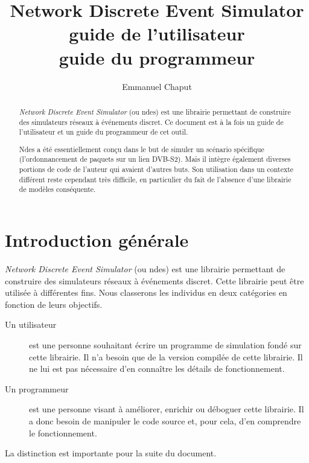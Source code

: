 \documentclass{article}
\title{Network Discrete Event Simulator\\guide de l'utilisateur\\guide du programmeur}
\author{Emmanuel Chaput}
\begin{document}
\maketitle

\begin{abstract}
   {\em Network Discrete Event Simulator} (ou {\sc ndes}) est une
librairie permettant de construire des simulateurs réseaux à
événements discret. Ce document est à la fois un guide de
l'utilisateur et un guide du programmeur de cet outil.

   {\sc Ndes} a été essentiellement conçu dans le but de simuler un
scénario spécifique (l'ordonnancement de paquets sur un lien
DVB-S2). Mais il intègre également diverses portions de code de
l'auteur qui avaient d'autres buts. Son utilisation dans un contexte
différent reste cependant très difficile, en particulier du fait de
l'absence d'une librairie de modèles conséquente.
\end{abstract}

\newpage
\tableofcontents
\newpage


%
\section{Introduction générale}

   {\em Network Discrete Event Simulator} (ou {\sc ndes}) est une
librairie permettant de construire des simulateurs réseaux à
événements discret. Cette librairie peut être utilisée à différentes
fins. Nous classerons les individus en deux catégories en fonction de
leurs objectifs.

\begin{description}
   \item[Un utilisateur] est une personne souhaitant écrire un
     programme de simulation fondé sur cette librairie. Il n'a besoin
     que de la version compilée de cette librairie. Il ne lui est pas
     nécessaire d'en connaître les détails de fonctionnement.
   \item[Un programmeur] est une personne visant à améliorer, enrichir
     ou déboguer cette librairie. Il a donc besoin de manipuler le
     code source et, pour cela, d'en comprendre le fonctionnement.
\end{description}

   La distinction est importante pour la suite du
document.
\end{document}
